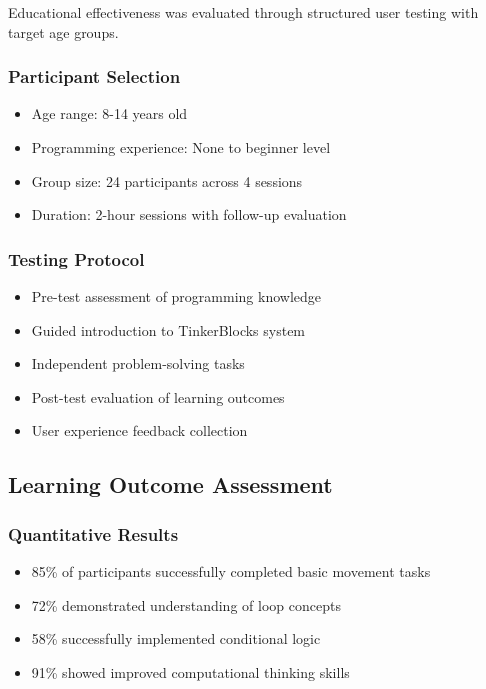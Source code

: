 Educational effectiveness was evaluated through structured user testing with target age groups.

\subsubsection{Participant Selection}
\begin{itemize}
    \item Age range: 8-14 years old
    \item Programming experience: None to beginner level
    \item Group size: 24 participants across 4 sessions
    \item Duration: 2-hour sessions with follow-up evaluation
\end{itemize}

\subsubsection{Testing Protocol}
\begin{itemize}
    \item Pre-test assessment of programming knowledge
    \item Guided introduction to TinkerBlocks system
    \item Independent problem-solving tasks
    \item Post-test evaluation of learning outcomes
    \item User experience feedback collection
\end{itemize}

\subsection{Learning Outcome Assessment}

\subsubsection{Quantitative Results}
\begin{itemize}
    \item 85\% of participants successfully completed basic movement tasks
    \item 72\% demonstrated understanding of loop concepts
    \item 58\% successfully implemented conditional logic
    \item 91\% showed improved computational thinking skills
\end{itemize}

